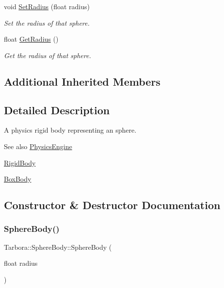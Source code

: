 \begin{DoxyCompactItemize}
void \hyperlink{classTarbora_1_1SphereBody_a218bff80687143aff24f524cc01f2175}{Set\+Radius} (float radius)
\begin{DoxyCompactList}\small\item\em Set the radius of that sphere. \end{DoxyCompactList}\item 
\mbox{\label{classTarbora_1_1SphereBody_a5554aa58df71f4ada4537d48b5e0b1d3}} 
float \hyperlink{classTarbora_1_1SphereBody_a5554aa58df71f4ada4537d48b5e0b1d3}{Get\+Radius} ()
\begin{DoxyCompactList}\small\item\em Get the radius of that sphere. \end{DoxyCompactList}\end{DoxyCompactItemize}
\subsection*{Additional Inherited Members}


\subsection{Detailed Description}
A physics rigid body representing an sphere. 

\begin{DoxySeeAlso}{See also}
\hyperlink{classTarbora_1_1PhysicsEngine}{Physics\+Engine} 

\hyperlink{classTarbora_1_1RigidBody}{Rigid\+Body} 

\hyperlink{classTarbora_1_1BoxBody}{Box\+Body} 
\end{DoxySeeAlso}


\subsection{Constructor \& Destructor Documentation}
\mbox{\label{classTarbora_1_1SphereBody_a35e582dfbc4660cb796360ceec62e168}} 
\subsubsection{\texorpdfstring{Sphere\+Body()}{SphereBody()}}
{\footnotesize\ttfamily Tarbora\+::\+Sphere\+Body\+::\+Sphere\+Body (\begin{DoxyParamCaption}\item[{float}]{radius }\end{DoxyParamCaption})}



